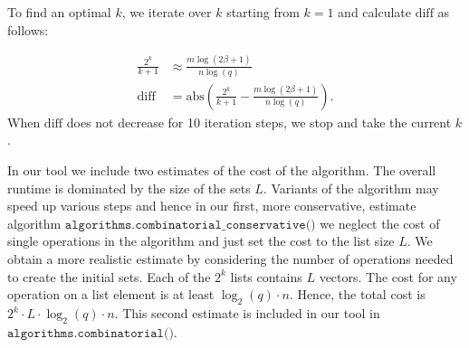 To find an optimal $k$, we iterate over $k$ starting from $k=1$ and calculate $\text{diff}$ as follows:

\begin{align}
  \frac{2^k}{k+1} & \approx \frac{m \log(2\beta + 1)}{n \log(q)}                                     \\
  \text{diff}     & = \text{abs}\left(\frac{2^k}{k+1} - \frac{m \log(2\beta + 1)}{n \log(q)}\right).
\end{align}
When $\text{diff}$ does not decrease for 10 iteration steps, we stop and take the current $k$. %

In our tool we include two estimates of the cost of the algorithm. The overall runtime is dominated by the size of the sets $L$. Variants of the algorithm may speed up various steps and hence in our first, more conservative, estimate algorithm $\texttt{algorithms.combinatorial\_conservative()}$ we neglect the cost of single operations in the algorithm and just set the cost to the list size $L$. We obtain a more realistic estimate by considering the number of operations needed to create the initial sets. Each of the $2^k$ lists contains $L$ vectors. The cost for any operation on a list element is at least $\log_2(q) \cdot n$. Hence, the total cost is $2^k \cdot L \cdot \log_2(q) \cdot n$. This second estimate is included in our tool in $\texttt{algorithms.combinatorial()}$.


